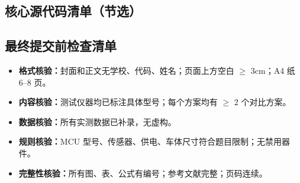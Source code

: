 \documentclass[12pt,a4paper,fontset=fandol]{ctexart}
\begin{document}
\subsection{核心源代码清单（节选）}

\subsection{最终提交前检查清单}
\begin{itemize}
  \item[$\square$] \textbf{格式核验：}封面和正文无学校、代码、姓名；页面上方空白 $\ge$ 3cm；A4 纸 6--8 页。
  \item[$\square$] \textbf{内容核验：}测试仪器均已标注具体型号；每个方案均有 $\ge$ 2 个对比方案。
  \item[$\square$] \textbf{数据核验：}所有实测数据已补录，无虚构。
  \item[$\square$] \textbf{规则核验：}MCU 型号、传感器、供电、车体尺寸符合题目限制；无禁用器件。
  \item[$\square$] \textbf{完整性核验：}所有图、表、公式有编号；参考文献完整；页码连续。
\end{itemize}
\end{document}
